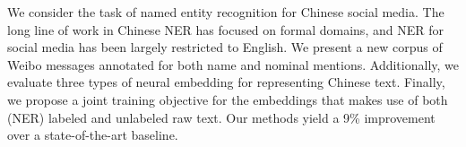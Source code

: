 We consider the task of named entity recognition for Chinese social media. The long line of work in Chinese NER has focused on formal domains, and NER for social media has been largely restricted to English. We present a new corpus of Weibo messages annotated for both name and nominal mentions. Additionally, we evaluate three types of neural embedding for representing Chinese text. Finally, we propose a joint training objective for the embeddings that makes use of both (NER) labeled and unlabeled raw text. Our methods yield a 9\% improvement over a state-of-the-art baseline.
